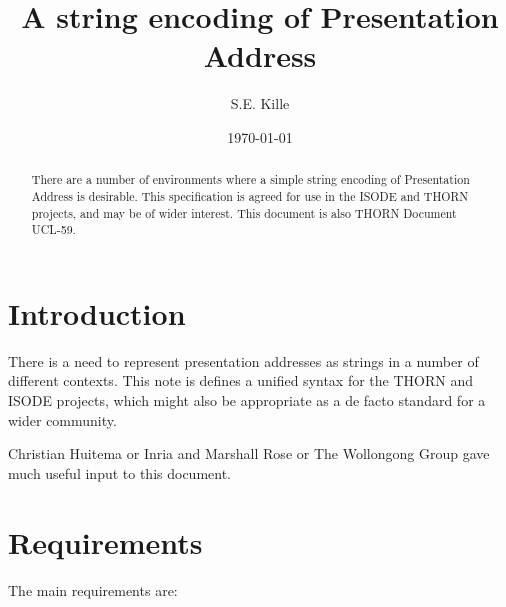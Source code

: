\author {S.E. Kille}
\date {\today}
\title {A string encoding of Presentation Address}


\maketitle
\begin {abstract}
There are a number of environments where a simple string encoding of
Presentation Address is desirable. 
This specification is agreed for use in the ISODE and THORN projects, and
may be of wider interest.
This document is also THORN Document UCL-59.
\end {abstract}

\section {Introduction}

There is a need to represent presentation addresses as strings in a number
of different contexts.
This note is defines a unified syntax for the THORN and ISODE
projects, which might also 
be appropriate as a de facto standard for a wider community.  

Christian Huitema or Inria and Marshall Rose or The Wollongong Group gave
much useful input to this document.

\section {Requirements}

The main requirements are: 

